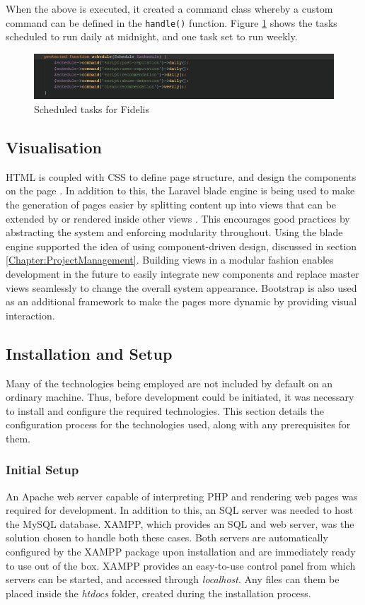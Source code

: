 When the above is executed, it created a command class whereby a custom command can be defined in the \texttt{handle()} function. Figure \ref{fig:FidelisSchedule} shows the tasks scheduled to run daily at midnight, and one task set to run weekly.

\begin{figure}[H]
\centering
\includegraphics[width=\textwidth]{Images/Implementation/FidelisSchedule}
\caption{Scheduled tasks for Fidelis}
\label{fig:FidelisSchedule}
\end{figure}

\subsection{Visualisation}
HTML is coupled with CSS to define page structure, and design the components on the page \cite{W3:HTML5, W3:CSS}. In addition to this, the Laravel blade engine is being used to make the generation of pages easier by splitting content up into views that can be extended by or rendered inside other views \cite{Laravel:Blade}. This encourages good practices by abstracting the system and enforcing modularity throughout. Using the blade engine supported the idea of using component-driven design, discussed in section \ref{Chapter:ProjectManagement}. Building views in a modular fashion enables development in the future to easily integrate new components and replace master views seamlessly to change the overall system appearance. Bootstrap is also used as an additional framework to make the pages more dynamic by providing visual interaction.

\subsection{Installation and Setup}
Many of the technologies being employed are not included by default on an ordinary machine. Thus, before development could be initiated, it was necessary to install and configure the required technologies. This section details the configuration process for the technologies used, along with any prerequisites for them.

\subsubsection{Initial Setup}
An Apache web server capable of interpreting PHP and rendering web pages was required for development. In addition to this, an SQL server was needed to host the MySQL database. XAMPP, which provides an SQL and web server, was the solution chosen to handle both these cases. Both servers are automatically configured by the XAMPP package upon installation and are immediately ready to use out of the box. XAMPP provides an easy-to-use control panel from which servers can be started, and accessed through \textit{localhost}. Any files can them be placed inside the \textit{htdocs} folder, created during the installation process.

